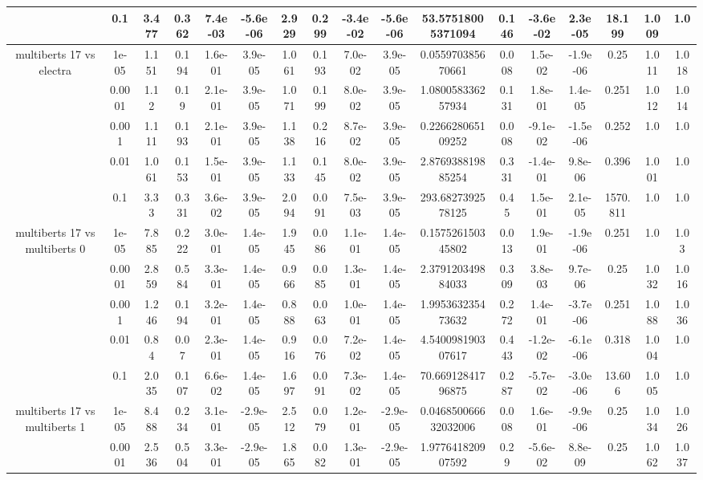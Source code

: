 \begin{tabular}{|c|c|c|c|c|c|c|c|c|c|c|c|c|c|c|c|c|}
 & 0.1 & 3.477 & 0.362 & 7.4e-03 & -5.6e-06 & 2.929 & 0.299 & -3.4e-02 & -5.6e-06 & 53.57518005371094 & 0.146 & -3.6e-02 & 2.3e-05 & 18.199 & 1.009 & 1.0 \\
\hline
\multirow{5}{*}{multiberts 17 vs electra } & 1e-05 & 1.151 & 0.194 & 1.6e-01 & 3.9e-05 & 1.061 & 0.193 & 7.0e-02 & 3.9e-05 & 0.055970385670661 & 0.008 & 1.5e-02 & -1.9e-06 & 0.25 & 1.011 & 1.018 \\
 & 0.0001 & 1.12 & 0.19 & 2.1e-01 & 3.9e-05 & 1.071 & 0.199 & 8.0e-02 & 3.9e-05 & 1.080058336257934 & 0.131 & 1.8e-01 & 1.4e-05 & 0.251 & 1.012 & 1.014 \\
 & 0.001 & 1.111 & 0.193 & 2.1e-01 & 3.9e-05 & 1.138 & 0.216 & 8.7e-02 & 3.9e-05 & 0.226628065109252 & 0.008 & -9.1e-02 & -1.5e-06 & 0.252 & 1.0 & 1.0 \\
 & 0.01 & 1.061 & 0.153 & 1.5e-01 & 3.9e-05 & 1.133 & 0.145 & 8.0e-02 & 3.9e-05 & 2.876938819885254 & 0.331 & -1.4e-01 & 9.8e-06 & 0.396 & 1.001 & 1.0 \\
 & 0.1 & 3.33 & 0.331 & 3.6e-02 & 3.9e-05 & 2.094 & 0.091 & 7.5e-03 & 3.9e-05 & 293.6827392578125 & 0.45 & 1.5e-01 & 2.1e-05 & 1570.811 & 1.0 & 1.0 \\
\hline
\multirow{5}{*}{multiberts 17 vs multiberts 0} & 1e-05 & 7.885 & 0.222 & 3.0e-01 & 1.4e-05 & 1.945 & 0.086 & 1.1e-01 & 1.4e-05 & 0.157526150345802 & 0.013 & 1.9e-01 & -1.9e-06 & 0.251 & 1.0 & 1.03 \\
 & 0.0001 & 2.859 & 0.584 & 3.3e-01 & 1.4e-05 & 0.966 & 0.085 & 1.3e-01 & 1.4e-05 & 2.379120349884033 & 0.309 & 3.8e-03 & 9.7e-06 & 0.25 & 1.032 & 1.016 \\
 & 0.001 & 1.246 & 0.194 & 3.2e-01 & 1.4e-05 & 0.888 & 0.063 & 1.0e-01 & 1.4e-05 & 1.995363235473632 & 0.272 & 1.4e-01 & -3.7e-06 & 0.251 & 1.088 & 1.036 \\
 & 0.01 & 0.84 & 0.07 & 2.3e-01 & 1.4e-05 & 0.916 & 0.076 & 7.2e-02 & 1.4e-05 & 4.540098190307617 & 0.443 & -1.2e-02 & -6.1e-06 & 0.318 & 1.004 & 1.0 \\
 & 0.1 & 2.035 & 0.107 & 6.6e-02 & 1.4e-05 & 1.697 & 0.091 & 7.3e-02 & 1.4e-05 & 70.66912841796875 & 0.287 & -5.7e-02 & -3.0e-06 & 13.606 & 1.005 & 1.0 \\
\hline
\multirow{5}{*}{multiberts 17 vs multiberts 1} & 1e-05 & 8.488 & 0.234 & 3.1e-01 & -2.9e-05 & 2.512 & 0.079 & 1.2e-01 & -2.9e-05 & 0.046850066632032006 & 0.008 & 1.6e-01 & -9.9e-06 & 0.25 & 1.034 & 1.026 \\
 & 0.0001 & 2.536 & 0.504 & 3.3e-01 & -2.9e-05 & 1.865 & 0.082 & 1.3e-01 & -2.9e-05 & 1.977641820907592 & 0.29 & -5.6e-02 & 8.8e-09 & 0.25 & 1.062 & 1.037 \\

\end{tabular}
